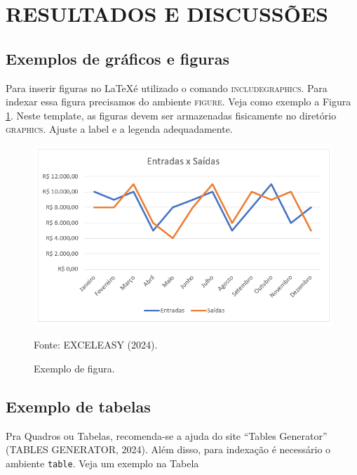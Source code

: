 \section{RESULTADOS E DISCUSSÕES}

\lipsum[1-1]

\subsection{Exemplos de gráficos e figuras}

Para inserir figuras no \LaTeX é utilizado o comando \textsc{includegraphics}. Para indexar essa figura precisamos do ambiente \textsc{figure}. Veja como exemplo a Figura \ref{fig:figura1}. Neste template, as figuras devem ser armazenadas fisicamente no diretório \textsc{graphics}.
Ajuste a label e a legenda adequadamente.

\begin{figure}   %
    \caption{Exemplo de figura.}
    \vspace{-0.5 cm}
    \begin{center}
    \includegraphics[scale=0.8]{graphics/exemploFigura1.png}
    \end{center}
    \vspace{-0.3 cm}
    \small{Fonte: EXCELEASY (2024).}
    \label{fig:figura1}
\end{figure}

\subsection{Exemplo de tabelas}

Pra Quadros ou Tabelas, recomenda-se  a ajuda do site ``Tables Generator'' (TABLES GENERATOR, 2024). Além disso, para indexação é necessário o ambiente \texttt{table}. Veja um exemplo na Tabela

